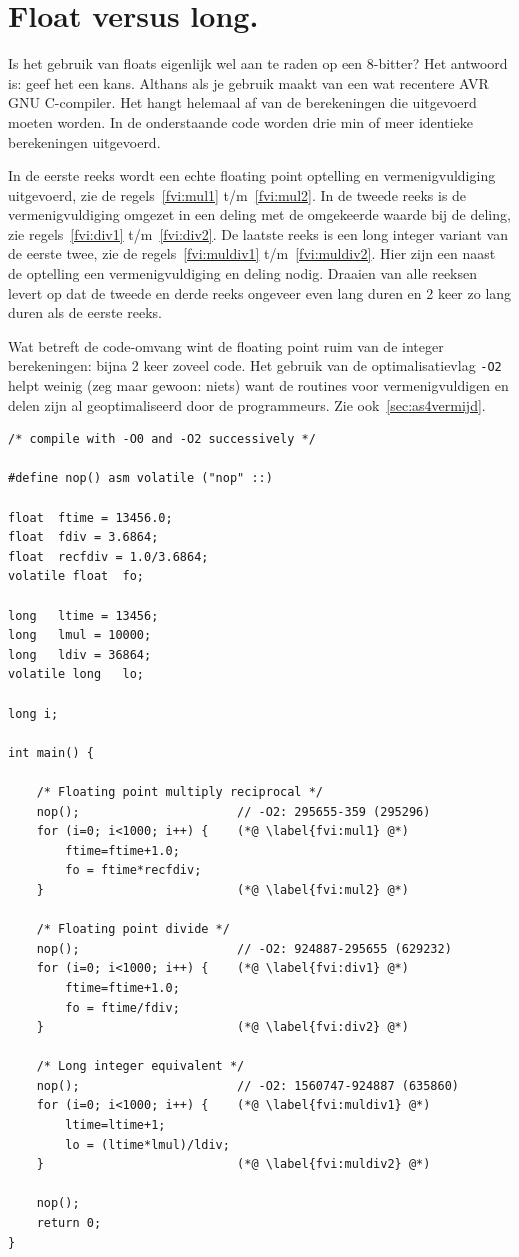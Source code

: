 \documentclass[12pt,a4paper,final,twoside,fleqn]{article}
\def\lstC{\lstinline[style=C]}
\begin{document}
\section{Float versus long.}
\label{sec:floatvsinteger}
Is het gebruik van floats eigenlijk wel aan te raden op een 8-bitter? Het antwoord
is: geef het een kans. Althans als je gebruik maakt van een wat recentere AVR GNU
C-compiler. Het hangt helemaal af van de berekeningen die uitgevoerd moeten worden.
In de onderstaande code worden drie min of meer identieke berekeningen uitgevoerd.

In de eerste reeks wordt een echte floating point optelling en vermenigvuldiging
uitgevoerd, zie de regels~\ref{fvi:mul1} t/m~\ref{fvi:mul2}. In de tweede reeks
is de vermenigvuldiging omgezet in een deling met de omgekeerde waarde bij de deling,
zie regels~\ref{fvi:div1} t/m~\ref{fvi:div2}. De laatste reeks is een long integer
variant van de eerste twee, zie de regels~\ref{fvi:muldiv1} t/m~\ref{fvi:muldiv2}.
Hier zijn een naast de optelling een vermenigvuldiging en deling nodig. Draaien van
alle reeksen levert op dat de tweede en derde reeks ongeveer even lang duren en 2
keer zo lang duren als de eerste reeks.

Wat betreft de code-omvang wint de floating point ruim van de integer berekeningen:
bijna 2 keer zoveel code. Het gebruik van de optimalisatievlag \lstC{-O2}
helpt weinig (zeg maar gewoon: niets) want de routines voor vermenigvuldigen en delen
zijn al geoptimaliseerd door de programmeurs. Zie ook~\ref{sec:as4vermijd}.

\begin{lstlisting}[style=C,caption=Voorbeeld float versus integer.]
/* compile with -O0 and -O2 successively */

#define nop() asm volatile ("nop" ::)

float  ftime = 13456.0;
float  fdiv = 3.6864;
float  recfdiv = 1.0/3.6864;
volatile float  fo;

long   ltime = 13456;
long   lmul = 10000;
long   ldiv = 36864;
volatile long   lo;

long i;

int main() {

	/* Floating point multiply reciprocal */
	nop();						// -O2: 295655-359 (295296)
	for (i=0; i<1000; i++) {	(*@ \label{fvi:mul1} @*)
		ftime=ftime+1.0;
		fo = ftime*recfdiv;
	}							(*@ \label{fvi:mul2} @*)

	/* Floating point divide */
	nop();						// -O2: 924887-295655 (629232)
	for (i=0; i<1000; i++) {	(*@ \label{fvi:div1} @*)
		ftime=ftime+1.0;
		fo = ftime/fdiv;
	}							(*@ \label{fvi:div2} @*)
 	
	/* Long integer equivalent */
	nop();						// -O2: 1560747-924887 (635860)
	for (i=0; i<1000; i++) {	(*@ \label{fvi:muldiv1} @*)
		ltime=ltime+1;
		lo = (ltime*lmul)/ldiv;
	}							(*@ \label{fvi:muldiv2} @*)

	nop();
	return 0;
}                
\end{lstlisting}
\end{document}
